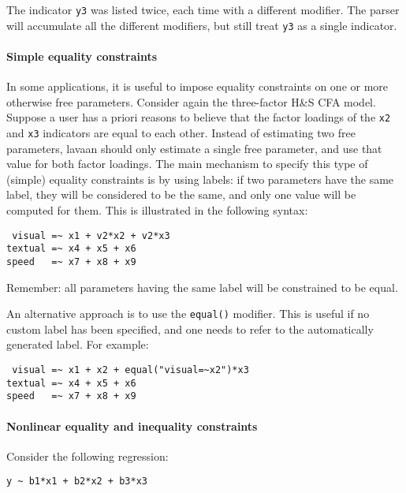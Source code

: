 The indicator \texttt{y3} was listed twice, each time with a different
modifier. The parser will accumulate all the different modifiers, but
still treat \texttt{y3} as a single indicator.

\hypertarget{simple-equality-constraints}{%
\paragraph{Simple equality
constraints}\label{simple-equality-constraints}}

In some applications, it is useful to impose equality constraints on one
or more otherwise free parameters. Consider again the three-factor H\&S
CFA model. Suppose a user has a priori reasons to believe that the
factor loadings of the \texttt{x2} and \texttt{x3} indicators are equal
to each other. Instead of estimating two free parameters, lavaan should
only estimate a single free parameter, and use that value for both
factor loadings. The main mechanism to specify this type of (simple)
equality constraints is by using labels: if two parameters have the same
label, they will be considered to be the same, and only one value will
be computed for them. This is illustrated in the following syntax:

\begin{verbatim}
 visual =~ x1 + v2*x2 + v2*x3
textual =~ x4 + x5 + x6
speed   =~ x7 + x8 + x9
\end{verbatim}

Remember: all parameters having the same label will be constrained to be
equal.

An alternative approach is to use the \texttt{equal()} modifier. This is
useful if no custom label has been specified, and one needs to refer to
the automatically generated label. For example:

\begin{verbatim}
 visual =~ x1 + x2 + equal("visual=~x2")*x3
textual =~ x4 + x5 + x6
speed   =~ x7 + x8 + x9
\end{verbatim}

\hypertarget{nonlinear-equality-and-inequality-constraints}{%
\paragraph{Nonlinear equality and inequality
constraints}\label{nonlinear-equality-and-inequality-constraints}}

Consider the following regression:

\begin{verbatim}
y ~ b1*x1 + b2*x2 + b3*x3
\end{verbatim}

